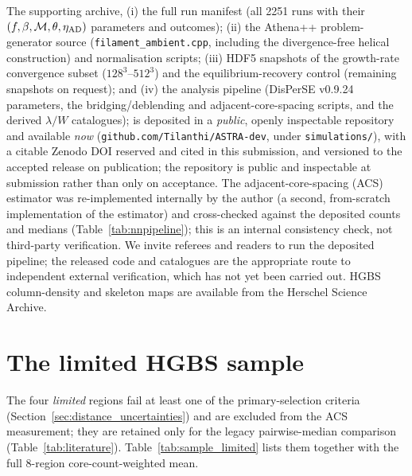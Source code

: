 \documentclass[usenatbib,twoside,twocolumn]{mnras}
\begin{document}
The supporting archive, (i) the full run manifest (all 2251 runs with their $(f,\beta,\mathcal{M},\theta,\eta_{\rm AD})$ parameters and outcomes); (ii) the Athena++ problem-generator source (\texttt{filament\_ambient.cpp}, including the divergence-free helical construction) and normalisation scripts; (iii) HDF5 snapshots of the growth-rate convergence subset ($128^3$--$512^3$) and the equilibrium-recovery control (remaining snapshots on request); and (iv) the analysis pipeline (DisPerSE v0.9.24 parameters, the bridging/deblending and adjacent-core-spacing scripts, and the derived $\lambda/W$ catalogues); is deposited in a \emph{public}, openly inspectable repository and available \emph{now} (\texttt{github.com/Tilanthi/ASTRA-dev}, under \texttt{simulations/}), with a citable Zenodo DOI reserved and cited in this submission, and versioned to the accepted release on publication; the repository is public and inspectable at submission rather than only on acceptance. The adjacent-core-spacing (ACS) estimator was re-implemented internally by the author (a second, from-scratch implementation of the estimator) and cross-checked against the deposited counts and medians (Table~\ref{tab:nnpipeline}); this is an internal consistency check, not third-party verification. We invite referees and readers to run the deposited pipeline; the released code and catalogues are the appropriate route to independent external verification, which has not yet been carried out. HGBS column-density and skeleton maps are available from the Herschel Science Archive.


\appendix

\section{The limited HGBS sample}
\label{sec:limited_sample}
The four \emph{limited} regions fail at least one of the primary-selection criteria (Section~\ref{sec:distance_uncertainties}) and are excluded from the ACS measurement; they are retained only for the legacy pairwise-median comparison (Table~\ref{tab:literature}). Table~\ref{tab:sample_limited} lists them together with the full 8-region core-count-weighted mean.
\end{document}
